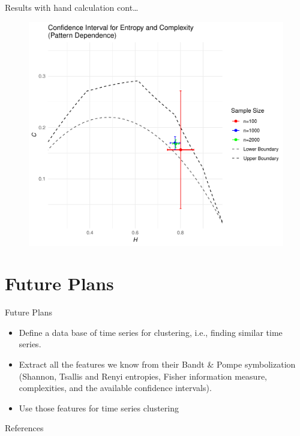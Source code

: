 \documentclass{beamer}
\begin{document}
\begin{frame}{Results with hand calculation cont\dots}
	\begin{figure}[hbt]
		\centering
		\includegraphics[width=0.7 \textwidth]{CI for pattern dependence}
		\end{figure}
\end{frame}


\section{Future Plans}

\begin{frame}{Future Plans}
    \begin{itemize}
        \item Define a data base of time series for clustering, i.e., finding similar time series.
        \item Extract all the features we know from their Bandt \& Pompe symbolization (Shannon, Tsallis and Renyi entropies, Fisher information measure, complexities, and the available confidence intervals).
        \item Use those features for time series clustering
    \end{itemize}
\end{frame}

\begin{frame}[allowframebreaks]{References}
    
    
    
\end{frame}
\end{document}
